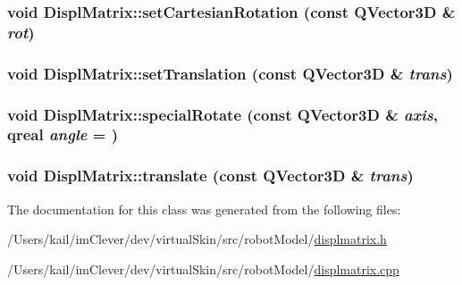 \label{class_robot_model_1_1_displ_matrix_ab976907c6be66c0aee20a24991ce4159}
\hypertarget{class_robot_model_1_1_displ_matrix_a8654f5029974e0154c3c46ec2bb3dbe3}{
\subsubsection[{setCartesianRotation}]{\setlength{\rightskip}{0pt plus 5cm}void DisplMatrix::setCartesianRotation (const QVector3D \& {\em rot})}}
\label{class_robot_model_1_1_displ_matrix_a8654f5029974e0154c3c46ec2bb3dbe3}
\hypertarget{class_robot_model_1_1_displ_matrix_a9ea9b65326be614baea1ea86a2a1b258}{
\subsubsection[{setTranslation}]{\setlength{\rightskip}{0pt plus 5cm}void DisplMatrix::setTranslation (const QVector3D \& {\em trans})}}
\label{class_robot_model_1_1_displ_matrix_a9ea9b65326be614baea1ea86a2a1b258}
\hypertarget{class_robot_model_1_1_displ_matrix_ac77a7ddd42d4a58251823c1fe06d65a2}{
\subsubsection[{specialRotate}]{\setlength{\rightskip}{0pt plus 5cm}void DisplMatrix::specialRotate (const QVector3D \& {\em axis}, \/  qreal {\em angle} = {})}}
\label{class_robot_model_1_1_displ_matrix_ac77a7ddd42d4a58251823c1fe06d65a2}
\hypertarget{class_robot_model_1_1_displ_matrix_ae9aa3671b52f8300ac2f11648fa1fddf}{
\subsubsection[{translate}]{\setlength{\rightskip}{0pt plus 5cm}void DisplMatrix::translate (const QVector3D \& {\em trans})}}
\label{class_robot_model_1_1_displ_matrix_ae9aa3671b52f8300ac2f11648fa1fddf}


The documentation for this class was generated from the following files:\begin{DoxyCompactItemize}
\item 
/Users/kail/imClever/dev/virtualSkin/src/robotModel/\hyperlink{displmatrix_8h}{displmatrix.h}\item 
/Users/kail/imClever/dev/virtualSkin/src/robotModel/\hyperlink{displmatrix_8cpp}{displmatrix.cpp}\end{DoxyCompactItemize}
